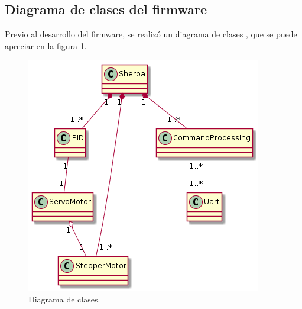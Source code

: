 \subsection{Diagrama de clases del firmware}
\label{subsec:Diagrama de clase}
Previo al desarrollo del firmware, se realizó un diagrama de clases \citep{DIAGRAMADECLASES}, que se puede apreciar en la figura \ref{fig:Diagrama de clase.}. 
\begin{figure}[h]
	\centering
	\includegraphics[scale=.75]{./Figures/DiagramaDeClase-DistribucionDeAgua.png}
	\caption{Diagrama de clases.}
	\label{fig:Diagrama de clase.}
	\end{figure}
